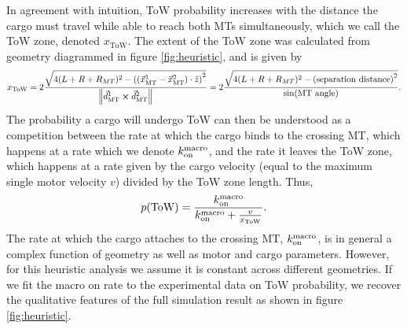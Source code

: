 In agreement with intuition, ToW probability increases with the distance the cargo must travel while able to reach both MTs simultaneously, which we call the ToW zone, denoted $x_\text{ToW}$. The extent of the ToW zone was calculated from geometry diagrammed in figure \ref{fig:heuristic}, and is given by
\begin{equation} \label{eq:ToW_zone}
x_\text{ToW}=2\frac{ \sqrt{4 (L+R+R_{MT})^2-\left( (\vec{x}_\text{MT}^1-\vec{x}_\text{MT}^2)\cdot \hat{z} \right)^2} }{\norm{\vec{d}_\text{MT}^1 \cross \vec{d}_\text{MT}^2}}
= 2\frac{ \sqrt{4 (L+R+R_{MT})^2-\left( \text{separation distance} \right)^2} }{\sin(\text{MT angle})}.
\end{equation}
The probability a cargo will undergo ToW can then be understood as a competition between the rate at which the cargo binds to the crossing MT, which happens at a rate which we denote $k_\text{on}^\text{macro}$, and the rate it leaves the ToW zone, which happens at a rate given by the cargo velocity (equal to the maximum single motor velocity $v$) divided by the ToW zone length. Thus,
\begin{equation} \label{eq:rate_war}
p(\text{ToW})=\frac{ k_\text{on}^\text{macro}}{k_\text{on}^\text{macro} +  \frac{v}{x_\text{ToW}}}.
\end{equation}
The rate at which the cargo attaches to the crossing MT, $k_\text{on}^\text{macro}$, is in general a complex function of geometry as well as motor and cargo parameters. However, for this heuristic analysis we assume it is constant across different geometries. If we fit the macro on rate to the experimental data on ToW probability, we recover the qualitative features of the full simulation result as shown in figure \ref{fig:heuristic}.

